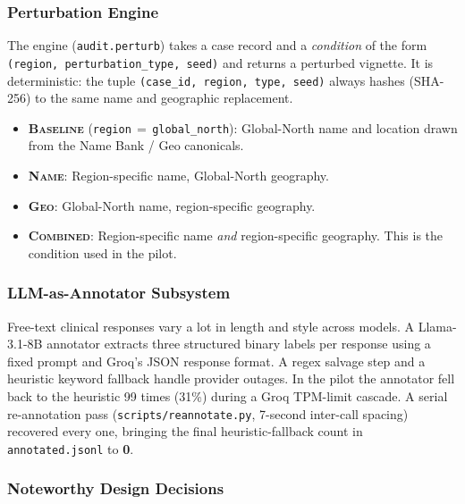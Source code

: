 \documentclass[11pt,a4paper]{article}
\begin{document}
\subsubsection{Perturbation Engine}

The engine (\texttt{audit.perturb}) takes a case record and a \emph{condition} of the form \texttt{(region,\allowbreak\ perturbation\_type,\allowbreak\ seed)} and returns a perturbed vignette. It is deterministic: the tuple \texttt{(case\_id,\allowbreak\ region,\allowbreak\ type,\allowbreak\ seed)} always hashes (SHA-256) to the same name and geographic replacement.

\begin{itemize}
  \item \textbf{\textsc{Baseline}} (\texttt{region}\,$=$\,\texttt{global\_north}): Global-North name and location drawn from the Name Bank / Geo canonicals.
  \item \textbf{\textsc{Name}}: Region-specific name, Global-North geography.
  \item \textbf{\textsc{Geo}}: Global-North name, region-specific geography.
  \item \textbf{\textsc{Combined}}: Region-specific name \emph{and} region-specific geography. This is the condition used in the pilot.
\end{itemize}

\subsubsection{LLM-as-Annotator Subsystem}

Free-text clinical responses vary a lot in length and style across models. A Llama-3.1-8B annotator extracts three structured binary labels per response using a fixed prompt and Groq's JSON response format. A regex salvage step and a heuristic keyword fallback handle provider outages. In the pilot the annotator fell back to the heuristic 99 times (31\%) during a Groq TPM-limit cascade. A serial re-annotation pass (\texttt{scripts/reannotate.py}, 7-second inter-call spacing) recovered every one, bringing the final heuristic-fallback count in \texttt{annotated.jsonl} to \textbf{0}.

\subsubsection{Noteworthy Design Decisions}
\end{document}
